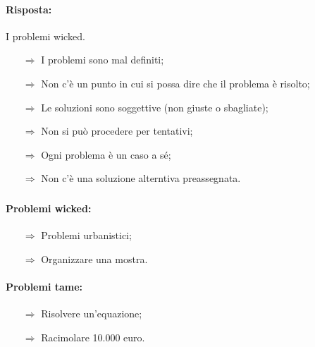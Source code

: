 \paragraph{Risposta:} I problemi wicked.

\begin{itemize}
    \item [$\Rightarrow$] I problemi sono mal definiti;
    \item [$\Rightarrow$] Non c'è un punto in cui si possa dire che il problema è risolto;
    \item [$\Rightarrow$] Le soluzioni sono soggettive (non giuste o sbagliate);
    \item [$\Rightarrow$] Non si può procedere per tentativi;
    \item [$\Rightarrow$] Ogni problema è un caso a sé;
    \item [$\Rightarrow$] Non c'è una soluzione alterntiva preassegnata.
\end{itemize}

\subsubsection{}


\paragraph{Problemi wicked:}

\begin{itemize}
    \item [$\Rightarrow$] Problemi urbanistici;
    \item [$\Rightarrow$] Organizzare una mostra.
\end{itemize}

\paragraph{Problemi tame:}

\begin{itemize}
    \item [$\Rightarrow$] Risolvere un'equazione;
    \item [$\Rightarrow$] Racimolare 10.000 euro.
\end{itemize}

\subsubsection{}

